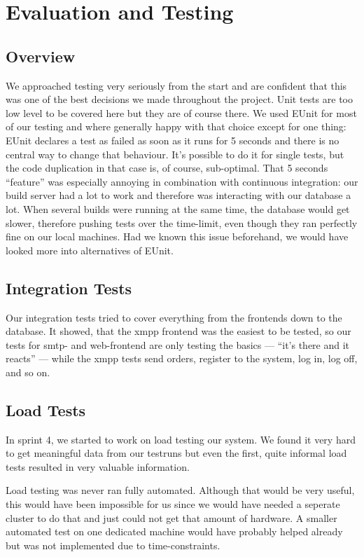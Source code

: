 \documentclass[11pt,a4paper]{report}
\newcommand{\hi}[1]{{\color{red}\em #1\/}\\}
\begin{document}
\chapter{Evaluation and Testing}
\section{Overview}
We approached testing very seriously from the start and are confident that this
was one of the best decisions we made throughout the project. Unit tests are too
low level to be covered here but they are of course there. We used EUnit for
most of our testing and where generally happy with that choice except for one
thing: EUnit declares a test as failed as soon as it runs for 5 seconds and
there is no central way to change that behaviour. It's possible to do it for
single tests, but the code duplication in that case is, of course, sub-optimal.
That 5 seconds ``feature'' was especially annoying in combination with
continuous integration: our build server had a lot to work and therefore was
interacting with our database a lot. When several builds were running at the
same time, the database would get slower, therefore pushing tests over the
time-limit, even though they ran perfectly fine on our local machines. Had we
known this issue beforehand, we would have looked more into alternatives of
EUnit.

\section{Integration Tests}
Our integration tests tried to cover everything from the frontends down to the
database. It showed, that the xmpp frontend was the easiest to be tested, so
our tests for smtp- and web-frontend are only testing the basics --- ``it's
there and it reacts'' --- while the xmpp tests send orders, register to the 
system, log in, log off, and so on.

\section{Load Tests}
In sprint 4, we started to work on load testing our system. We found it very
hard to get meaningful data from our testruns but even the first, quite informal
load tests resulted in very valuable information.

Load testing was never ran fully automated. Although that would be very useful, 
this would have been impossible for us since we would have needed a seperate
cluster to do that and just could not get that amount of hardware.
A smaller automated test on one dedicated machine would have probably helped
already but was not implemented due to time-constraints.
\end{document}
